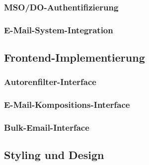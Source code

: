 \documentclass[11pt,a4paper]{article}
\begin{document}
\subsubsection{MSO/DO-Authentifizierung}

\subsubsection{E-Mail-System-Integration}

\subsection{Frontend-Implementierung}

\subsubsection{Autorenfilter-Interface}

\subsubsection{E-Mail-Kompositions-Interface}

\subsubsection{Bulk-Email-Interface}

\subsection{Styling und Design}
\end{document}
